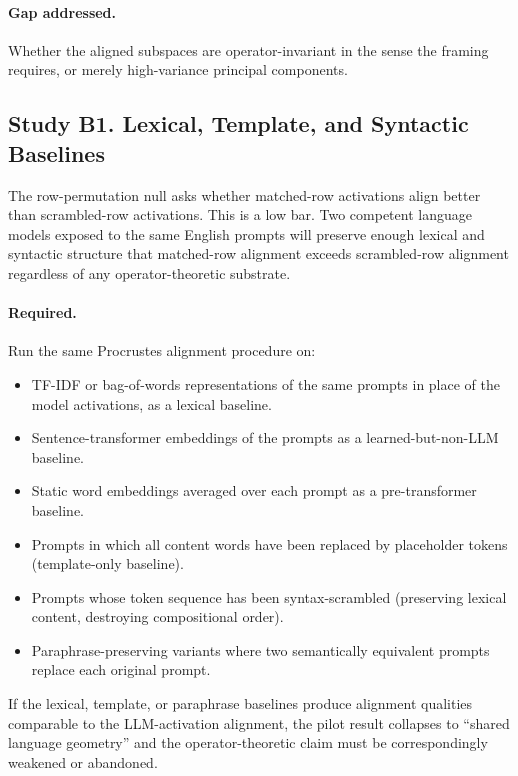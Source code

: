 \paragraph{Gap addressed.} Whether the aligned subspaces are
operator-invariant in the sense the framing requires, or merely
high-variance principal components.

\subsection{Study B1. Lexical, Template, and Syntactic Baselines}

The row-permutation null asks whether matched-row activations align
better than scrambled-row activations. This is a low bar. Two
competent language models exposed to the same English prompts will
preserve enough lexical and syntactic structure that matched-row
alignment exceeds scrambled-row alignment regardless of any
operator-theoretic substrate.

\paragraph{Required.} Run the same Procrustes alignment procedure on:

\begin{itemize}
    \item TF-IDF or bag-of-words representations of the same prompts
        in place of the model activations, as a lexical baseline.
    \item Sentence-transformer embeddings of the prompts as a
        learned-but-non-LLM baseline.
    \item Static word embeddings averaged over each prompt
        \cite{mikolov2013distributed} as a pre-transformer baseline.
    \item Prompts in which all content words have been replaced by
        placeholder tokens (template-only baseline).
    \item Prompts whose token sequence has been syntax-scrambled
        (preserving lexical content, destroying compositional order).
    \item Paraphrase-preserving variants where two semantically
        equivalent prompts replace each original prompt.
\end{itemize}

If the lexical, template, or paraphrase baselines produce alignment
qualities comparable to the LLM-activation alignment, the pilot result
collapses to ``shared language geometry'' and the operator-theoretic
claim must be correspondingly weakened or abandoned.

